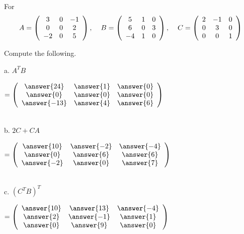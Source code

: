 \documentclass{ximera}
\author{Parisa Fatheddin}
\begin{document}
\begin{exercise}

For
\begin{equation*}
A = \left(\begin{array}{ccc}
3 & 0 & -1\\
0 & 0 & 2\\
-2 & 0 & 5
\end{array}\right), \hspace{.4cm}
B = \left(\begin{array}{ccc}
5 & 1 & 0\\
6 & 0 & 3\\
-4 & 1 & 0
\end{array}\right), \hspace{.4cm}
C = \left(\begin{array}{ccc}
2 & -1 & 0\\
0 & 3 & 0 \\
0 & 0 & 1
\end{array}\right)
\end{equation*}

Compute the following.

a. $A^{T} B $ \begin{prompt}$ = \left(\begin{array}{ccc}
\answer{24} & \answer{1} & \answer{0}\\
\answer{0} & \answer{0} & \answer{0}\\
\answer{-13} & \answer{4} & \answer{6}
\end{array}\right)$
\end{prompt}\\

b. $2C + CA$ \begin{prompt} $ = \left(\begin{array}{ccc}
\answer{10} & \answer{-2} & \answer{-4}\\
\answer{0} & \answer{6} & \answer{6}\\
\answer{-2} & \answer{0} & \answer{7}
\end{array}\right)$
\end{prompt}\\

c. $\left(C^{T}B\right)^{T}$ \begin{prompt} $ = \left(\begin{array}{ccc}
\answer{10} & \answer{13} & \answer{-4}\\
\answer{2} & \answer{-1} & \answer{1}\\
\answer{0} & \answer{9} & \answer{0}
\end{array}\right)$
\end{prompt}\\


\end{exercise}
\end{document}
